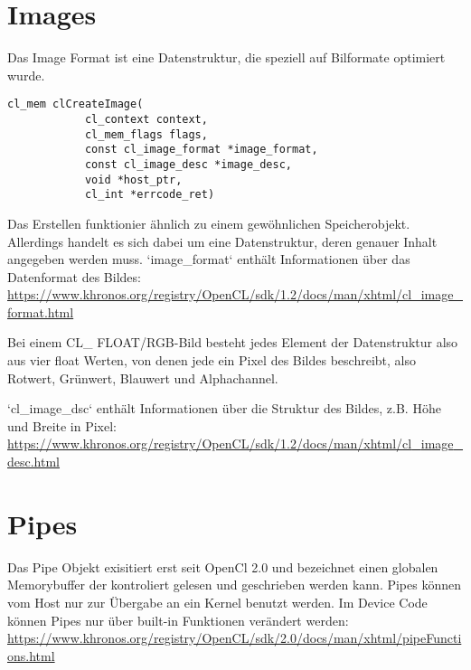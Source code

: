		\section{Images}
		Das Image Format ist eine Datenstruktur, die speziell auf Bilformate optimiert wurde.
		\begin{lstlisting}[caption=OpenCL Images]
		cl_mem clCreateImage(
			cl_context context, 
			cl_mem_flags flags,
			const cl_image_format *image_format,
			const cl_image_desc *image_desc,
			void *host_ptr,
			cl_int *errcode_ret)
		\end{lstlisting}	
			
		Das Erstellen funktionier ähnlich zu einem gewöhnlichen Speicherobjekt. Allerdings handelt es sich dabei um eine Datenstruktur, deren genauer Inhalt angegeben werden muss. \li`image_format` enthält Informationen über das Datenformat des Bildes: \url{https://www.khronos.org/registry/OpenCL/sdk/1.2/docs/man/xhtml/cl_image_format.html}
		
		Bei einem CL\_ FLOAT/RGB-Bild besteht jedes Element der Datenstruktur also aus vier float Werten, von denen jede ein Pixel des Bildes beschreibt, also Rotwert, Grünwert, Blauwert und Alphachannel.
		
		\li`cl_image_dsc` enthält Informationen über die Struktur des Bildes, z.B. Höhe und Breite in Pixel: \href{https://www.khronos.org/registry/OpenCL/sdk/1.2/docs/man/xhtml/cl_image_desc.html}{\small https://www.khronos.org/registry/OpenCL/sdk/1.2/docs/man/xhtml/cl{\_}image{\_}desc.html}
		
		\section{Pipes}
		Das Pipe Objekt exisitiert erst seit OpenCl 2.0 und bezeichnet einen globalen Memorybuffer der kontroliert gelesen und geschrieben werden kann. Pipes können vom Host nur zur Übergabe an ein \Gls{Kernel} benutzt werden. Im Device Code können Pipes nur über built-in Funktionen verändert werden: \url{https://www.khronos.org/registry/OpenCL/sdk/2.0/docs/man/xhtml/pipeFunctions.html}
		

